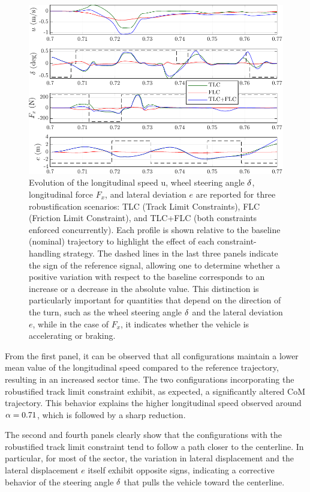 \begin{figure}
	\centering
	\includegraphics{Fig/ol_telemetries.pdf}
	\caption{Evolution of the longitudinal speed u, wheel steering angle $\delta$, longitudinal force $F_x$, and lateral deviation $e$ are reported for three robustification scenarios: TLC (Track Limit Constraints), FLC (Friction Limit Constraint), and TLC+FLC (both constraints enforced concurrently). Each profile is shown relative to the baseline (nominal) trajectory to highlight the effect of each constraint-handling strategy. The dashed lines in the last three panels indicate the sign of the reference signal, allowing one to determine whether a positive variation with respect to the baseline corresponds to an increase or a decrease in the absolute value. This distinction is particularly important for quantities that depend on the direction of the turn, such as the wheel steering angle $\delta$ and the lateral deviation $e$, while in the case of $F_x$, it indicates whether the vehicle is accelerating or braking.}
	\label{fig:ol_telemetries}
\end{figure}

From the first panel, it can be observed that all configurations maintain a lower mean value of the longitudinal speed compared to the reference trajectory, resulting in an increased sector time. The two configurations incorporating the robustified track limit constraint exhibit, as expected, a significantly altered CoM trajectory. This behavior explains the higher longitudinal speed observed around $\alpha = 0.71$, which is followed by a sharp reduction. 

The second and fourth panels clearly show that the configurations with the robustified track limit constraint tend to follow a path closer to the centerline. In particular, for most of the sector, the variation in lateral displacement and the lateral displacement $e$ itself exhibit opposite signs, indicating a corrective behavior of the steering angle $\delta$ that pulls the vehicle toward the centerline.

